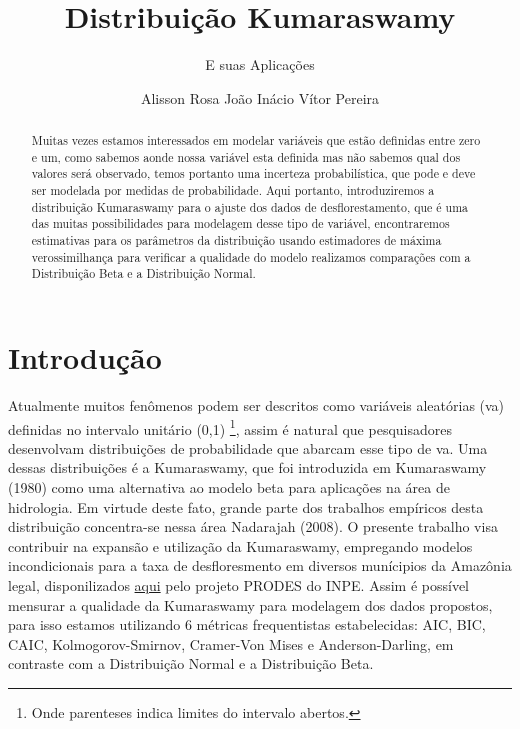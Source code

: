 \documentclass[
]{article}
\title{Distribuição Kumaraswamy}
\subtitle{E suas Aplicações}
\author{Alisson Rosa João Inácio Vítor Pereira}
\date{}
\begin{document}
\maketitle
\begin{abstract}
Muitas vezes estamos interessados em modelar variáveis que estão
definidas entre zero e um, como sabemos aonde nossa variável esta
definida mas não sabemos qual dos valores será observado, temos portanto
uma incerteza probabilística, que pode e deve ser modelada por medidas
de probabilidade. Aqui portanto, introduziremos a distribuição
Kumaraswamy para o ajuste dos dados de desflorestamento, que é uma das
muitas possibilidades para modelagem desse tipo de variável,
encontraremos estimativas para os parâmetros da distribuição usando
estimadores de máxima verossimilhança para verificar a qualidade do
modelo realizamos comparações com a Distribuição Beta e a Distribuição
Normal.
\end{abstract}
\ifdefined\Shaded\renewenvironment{Shaded}{\begin{tcolorbox}[sharp corners, interior hidden, enhanced, frame hidden, boxrule=0pt, borderline west={3pt}{0pt}{shadecolor}, breakable]}{\end{tcolorbox}}\fi

\section{\centering Introdução}

Atualmente muitos fenômenos podem ser descritos como variáveis
aleatórias (va) definidas no intervalo unitário (0,1) \footnote{Onde
  parenteses indica limites do intervalo abertos.}, assim é natural que
pesquisadores desenvolvam distribuições de probabilidade que abarcam
esse tipo de va. Uma dessas distribuições é a Kumaraswamy, que foi
introduzida em Kumaraswamy (1980) como uma alternativa ao modelo beta
para aplicações na área de hidrologia. Em virtude deste fato, grande
parte dos trabalhos empíricos desta distribuição concentra-se nessa área
Nadarajah (2008). O presente trabalho visa contribuir na expansão e
utilização da Kumaraswamy, empregando modelos incondicionais para a taxa
de desfloresmento em diversos munícipios da Amazônia legal,
disponilizados
\href{http://www.dpi.inpe.br/prodesdigital/prodesmunicipal.php}{aqui}
pelo projeto PRODES do INPE. Assim é possível mensurar a qualidade da
Kumaraswamy para modelagem dos dados propostos, para isso estamos
utilizando 6 métricas frequentistas estabelecidas: AIC, BIC, CAIC,
Kolmogorov-Smirnov, Cramer-Von Mises e Anderson-Darling, em contraste
com a Distribuição Normal e a Distribuição Beta.
\end{document}
